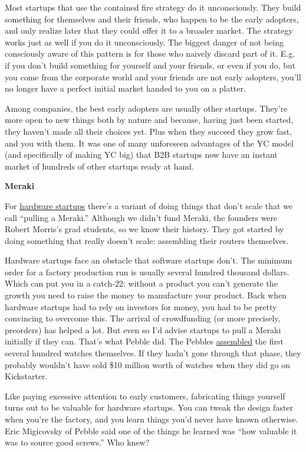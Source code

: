 \documentclass[12pt]{book}
\begin{document}
Most startups that use the contained fire strategy do it unconsciously.
They build something for themselves and their friends, who happen to be
the early adopters, and only realize later that they could offer it to a
broader market. The strategy works just as well if you do it
unconsciously. The biggest danger of not being consciously aware of this
pattern is for those who naively discard part of it. E.g. if you don't
build something for yourself and your friends, or even if you do, but
you come from the corporate world and your friends are not early
adopters, you'll no longer have a perfect initial market handed to you
on a platter.

Among companies, the best early adopters are usually other startups.
They're more open to new things both by nature and because, having just
been started, they haven't made all their choices yet. Plus when they
succeed they grow fast, and you with them. It was one of many unforeseen
advantages of the YC model (and specifically of making YC big) that B2B
startups now have an instant market of hundreds of other startups ready
at hand.

\textbf{Meraki}

For \href{hw.html}{hardware startups} there's a variant of doing things
that don't scale that we call ``pulling a Meraki.'' Although we didn't
fund Meraki, the founders were Robert Morris's grad students, so we know
their history. They got started by doing something that really doesn't
scale: assembling their routers themselves.

Hardware startups face an obstacle that software startups don't. The
minimum order for a factory production run is usually several hundred
thousand dollars. Which can put you in a catch-22: without a product you
can't generate the growth you need to raise the money to manufacture
your product. Back when hardware startups had to rely on investors for
money, you had to be pretty convincing to overcome this. The arrival of
crowdfunding (or more precisely, preorders) has helped a lot. But even
so I'd advise startups to pull a Meraki initially if they can. That's
what Pebble did. The Pebbles
\href{https://sep.turbifycdn.com/ty/cdn/paulgraham/eric.jpg?t=1730199416&}{assembled}
the first several hundred watches themselves. If they hadn't gone
through that phase, they probably wouldn't have sold \$10 million worth
of watches when they did go on Kickstarter.

Like paying excessive attention to early customers, fabricating things
yourself turns out to be valuable for hardware startups. You can tweak
the design faster when you're the factory, and you learn things you'd
never have known otherwise. Eric Migicovsky of Pebble said one of the
things he learned was ``how valuable it was to source good screws.'' Who
knew?
\end{document}
